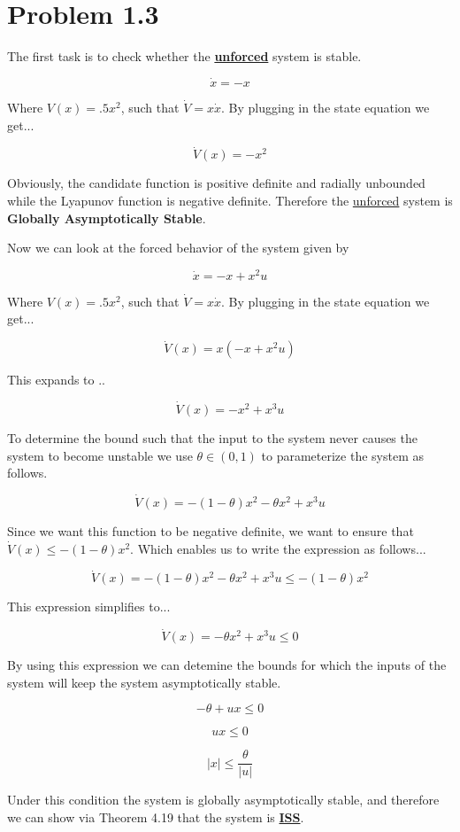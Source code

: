 \section*{Problem 1.3}


The first task is to check whether the \textbf{\underline{unforced}} system is stable.

$$
\dot{x} = -x
$$

\noindent Where $V(x) = .5x^2$, such that $\dot{V} = x\dot{x}$. By plugging in the state equation we get...

$$
\dot{V}(x) = -x^2
$$

\noindent Obviously, the candidate function is positive definite and radially unbounded while the Lyapunov function is negative definite. Therefore the \underline{unforced} system is \textbf{Globally Asymptotically Stable}.

\noindent Now we can look at the forced behavior of the system given by


$$
\dot{x} = -x + x^2u
$$

\noindent Where $V(x) = .5x^2$, such that $\dot{V} = x\dot{x}$. By plugging in the state equation we get...

$$
\dot{V}(x) = x(-x + x^2u)
$$

\noindent This expands to ..

$$
\dot{V}(x) = -x^2 + x^3u
$$

\noindent To determine the bound such that the input to the system never causes the system to become unstable we use $\theta \in (0,1)$ to parameterize the system as follows.


$$
\dot{V}(x) = -(1-\theta)x^2 - \theta x^2 + x^3u
$$

\noindent Since we want this function to be negative definite, we want to ensure that $ \dot{V}(x) \leq -(1-\theta)x^2 $. Which enables us to write the expression as follows...


$$
\dot{V}(x) = -(1-\theta)x^2 - \theta x^2 + x^3u \leq -(1-\theta)x^2
$$

\noindent This expression simplifies to...

$$
\dot{V}(x) = - \theta x^2 + x^3u \leq 0
$$

\noindent By using this expression we can detemine the bounds for which the inputs of the system will keep the system asymptotically stable.

$$
-\theta + ux \leq 0
$$

$$
ux \leq 0
$$


$$
|x| \leq \frac{\theta}{|u|}
$$

\noindent Under this condition the system is globally asymptotically stable, and therefore we can show via Theorem 4.19 that the system is \underline{\textbf{ISS}}.
